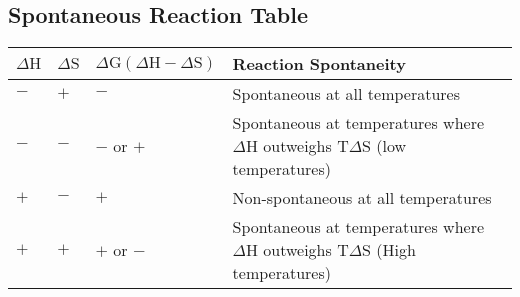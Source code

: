 \documentclass[]{article}
\begin{document}
\subsection{Spontaneous Reaction Table}
\begin{tabular}{p{.1\linewidth} p{.1\linewidth} p{.2\linewidth} p{.6\linewidth}}
$ \Delta \text{H} $ & $ \Delta \text{S} $ & $ \Delta \text{G}  (\Delta \text{H} - \Delta \text{S})$ & Reaction Spontaneity \\
\hline
$ - $ & $ + $ & $ - $ & Spontaneous at all temperatures \\
$ - $ & $ - $ & $ - $ or $ + $ & Spontaneous at temperatures where $ \Delta \text{H} $ outweighs $ \text{T} \Delta \text{S} $ (low temperatures) \\
$ + $ & $ - $ & $ + $ & Non-spontaneous at all temperatures \\

$ + $ & $ + $ & $ + $ or $ - $ & Spontaneous at temperatures where $ \Delta \text{H} $ outweighs $ \text{T} \Delta \text{S} $ (High temperatures) \\
\end{tabular}
\end{document}
